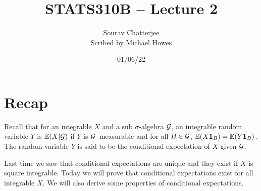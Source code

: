 




\title{STATS310B -- Lecture 2}
\author{Sourav Chatterjee\\ Scribed by Michael Howes}
\date{01/06/22}

\pagestyle{fancy}
\fancyhf{}


\maketitle
\tableofcontents
\section{Recap}
Recall that for an integrable $X$ and a sub $\sigma$-algebra ${\mathcal{G}}$, an integrable random variable $Y$ is ${\mathbb{E}}(X|{\mathcal{G}})$ if $Y$ is ${\mathcal{G}}$--measurable and for all $B \in {\mathcal{G}}$, ${\mathbb{E}}(X{{\bf 1}}_B) = {\mathbb{E}}(Y{{\bf 1}}_B)$. The random variable $Y$ is said to be the conditional expectation of $X$ given ${\mathcal{G}}$.

Last time we saw that conditional expectations are unique and they exist if $X$ is square integrable. Today we will prove that conditional expectations exist for all integrable $X$. We will also derive some properties of conditional expectations.
